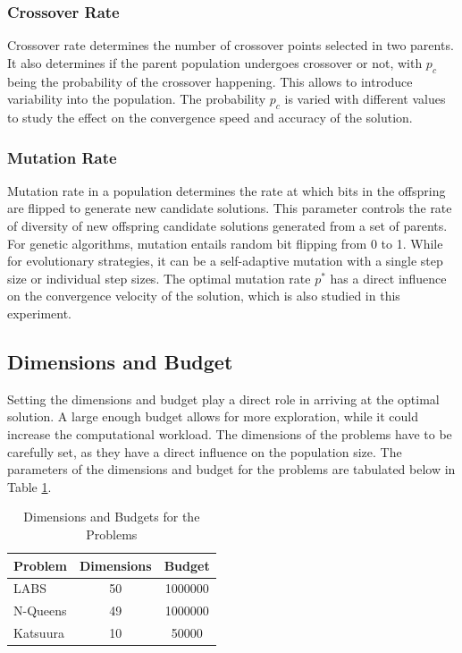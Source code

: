 \documentclass{article}
\begin{document}
\subsubsection{Crossover Rate}
Crossover rate determines the number of crossover points selected in two parents. It also determines if the parent population undergoes crossover or not, with $p_c$ being the probability of the crossover happening. This allows to introduce variability into the population. The probability $p_c$ is varied with different values to study the effect on the convergence speed and accuracy of the solution. 

\subsubsection{Mutation Rate}
Mutation rate in a population determines the rate at which bits in the offspring are flipped to generate new candidate solutions. This parameter controls the rate of diversity of new offspring candidate solutions generated from a set of parents. For genetic algorithms, mutation entails random bit flipping from 0 to 1. While for evolutionary strategies, it can be a self-adaptive mutation with a single step size or individual step sizes. The optimal mutation rate $p^*$ has a direct influence on the convergence velocity of the solution, which is also studied in this experiment. 

\subsection{Dimensions and Budget}
Setting the dimensions and budget play a direct role in arriving at the optimal solution. A large enough budget allows for more exploration, while it could increase the computational workload. The dimensions of the problems have to be carefully set, as they have a direct influence on the population size. The parameters of the dimensions and budget for the problems are tabulated below in Table \ref{tab:dim-budget}.
\begin{table}[h!]
    \centering
    \begin{tabular}{|l||c|c|} \hline 
          \textbf{Problem}&\textbf{Dimensions}&  \textbf{Budget}\\ \hline 
          LABS&50& 
     1000000\\ \hline
 N-Queens& 49&1000000\\\hline
 Katsuura& 10&50000\\\hline\end{tabular}
    \caption{Dimensions and Budgets for the Problems}
    \label{tab:dim-budget}
\end{table}
\end{document}
